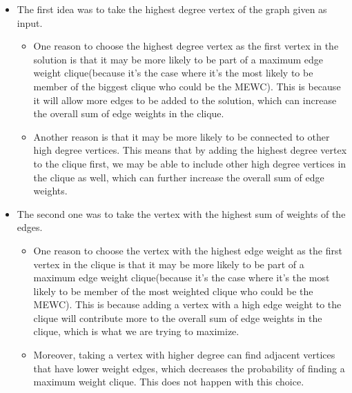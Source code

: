     \begin{itemize}
        \item The first idea was to take the highest degree vertex of the graph given as input. 
        \begin{itemize}
            \item One reason to choose the highest degree vertex as the first vertex in the solution is that it may be more likely to be part of a maximum edge weight clique(because it's the case where it's the most likely to be member of the biggest clique who could be the MEWC). This is because it will allow more edges to be added to the solution, which can increase the overall sum of edge weights in the clique.
            \item Another reason is that it may be more likely to be connected to other high degree vertices. This means that by adding the highest degree vertex to the clique first, we may be able to include other high degree vertices in the clique as well, which can further increase the overall sum of edge weights.
        \end{itemize}
        \item The second one was to take the vertex with the highest sum of weights of the edges.
        \begin{itemize}
            \item One reason to choose the vertex with the highest edge weight as the first vertex in the clique is that it may be more likely to be part of a maximum edge weight clique(because it's the case where it's the most likely to be member of the most weighted clique who could be the MEWC). This is because adding a vertex with a high edge weight to the clique will contribute more to the overall sum of edge weights in the clique, which is what we are trying to maximize.
            \item Moreover, taking a vertex with higher degree can find adjacent vertices that have lower weight edges, which decreases the probability of finding a maximum weight clique. This does not happen with this choice.
        \end{itemize}
    \end{itemize}
    
    \vspace{1\baselineskip}
    
